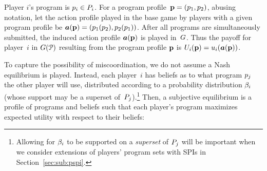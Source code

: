 \documentclass[sigconf]{aamas}
\theoremstyle{definition}
\begin{document}
Player $i$'s program is $p_i \in P_i$.
For a program profile~$\textbf{p} = (p_1, p_2)$,
abusing notation,
let the action profile played in the base game
by players with a given program profile
be $\boldsymbol{a}(\textbf{p}) = (p_1(p_2), p_2(p_1))$.
After all programs are simultaneously 
submitted,
the induced
action profile 
$\boldsymbol{a}(\textbf{p})$
is played in~$G$.
Thus the payoff for player~$i$ in $G(\mathcal{P})$
resulting
from the program profile 
$\textbf{p}$
is
$U_i(\textbf{p}) = u_i(\boldsymbol{a}(\textbf{p}))$.


To capture the possibility of 
miscoordination,
we do not assume a Nash equilibrium 
is played.
Instead, each player~$i$
has beliefs as to what program $p_j$ the
other player
will use, distributed
according to a probability
distribution $\beta_i$
(whose support may be a superset
of~$P_j$).\footnote{Allowing
for $\beta_i$ to be
supported on a \textit{superset} of $P_j$ will 
be important when we consider
extensions of players'
program sets
with SPIs
in Section~\ref{sec:sub:pspi}.}
Then, a subjective equilibrium 
\citep{subjective}
is a profile of programs and 
beliefs such that each
player's
program maximizes expected 
utility with respect to their beliefs: 
\end{document}
